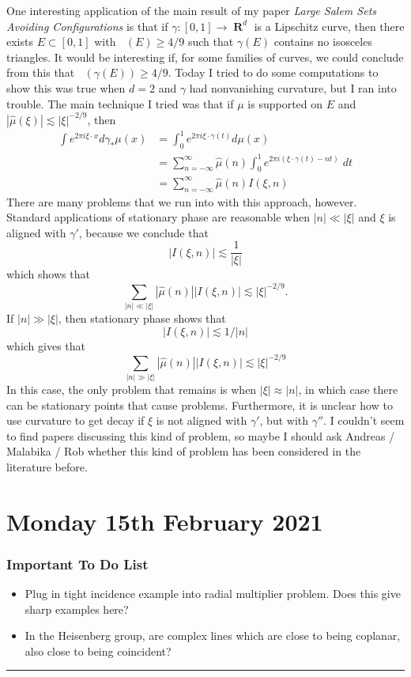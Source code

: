 \documentclass[openany,nobib,nols,a4paper,twoside,symmetric,justified,notoc]{tufte-book}
\theoremstyle{plain}
\theoremstyle{remark}
\theoremstyle{definition}
\newcommand{\currentchapter}{}
\let\oldchapter\chapter
\renewcommand{\chapter}[1]{\oldchapter{#1}\renewcommand{\currentchapter}{#1}}
\newenvironment{importanttodo}%
    {\subsection{Important To Do List}}%
    {\vspace{2mm}\hrule\hspace{\stretch{1}}\\}
\DeclareMathOperator{\RR}{\mathbf{R}}
\DeclareMathOperator{\fordim}{\text{dim}_{\mathbf{F}}}
\begin{document}
One interesting application of the main result of my paper \emph{Large Salem Sets Avoiding Configurations} is that if $\gamma: [0,1] \to \RR^d$ is a Lipschitz curve, then there exists $E \subset [0,1]$ with $\fordim(E) \geq 4/9$ such that $\gamma(E)$ contains no isosceles triangles. It would be interesting if, for some families of curves, we could conclude from this that $\fordim(\gamma(E)) \geq 4/9$. Today I tried to do some computations to show this was true when $d = 2$ and $\gamma$ had nonvanishing curvature, but I ran into trouble. The main technique I tried was that if $\mu$ is supported on $E$ and $|\widehat{\mu}(\xi)| \lesssim |\xi|^{-2/9}$, then
%
\begin{align*}
    \int e^{2 \pi i \xi \cdot x} d\gamma_* \mu(x) &= \int_0^1 e^{2 \pi i \xi \cdot \gamma(t)} d\mu(x)\\
    &= \sum_{n = -\infty}^\infty \widehat{\mu}(n) \int_0^1 e^{2 \pi i(\xi \cdot \gamma(t) - nt)}\; dt\\
    &= \sum_{n = -\infty}^\infty \widehat{\mu}(n) I(\xi,n)
\end{align*}
%
There are many problems that we run into with this approach, however. Standard applications of stationary phase are reasonable when $|n| \ll |\xi|$ and $\xi$ is aligned with $\gamma'$, because we conclude that
%
\[ |I(\xi,n)| \lesssim \frac{1}{|\xi|} \]
%
which shows that
%
\[ \sum_{|n| \ll |\xi|} |\widehat{\mu}(n)| |I(\xi,n)| \lesssim |\xi|^{- 2/9}. \]
%
If $|n| \gg |\xi|$, then stationary phase shows that
%
\[ |I(\xi,n)| \lesssim 1/|n| \]
%
which gives that
%
\[ \sum_{|n| \gg |\xi|} |\widehat{\mu}(n)| |I(\xi,n)| \lesssim |\xi|^{-2/9} \]
%
In this case, the only problem that remains is when $|\xi| \approx |n|$, in which case there can be stationary points that cause problems. Furthermore, it is unclear how to use curvature to get decay if $\xi$ is not aligned with $\gamma'$, but with $\gamma''$. I couldn't seem to find papers discussing this kind of problem, so maybe I should ask Andreas / Malabika / Rob whether this kind of problem has been considered in the literature before.









\chapter{Monday 15th February 2021} \label{15022021}

\begin{importanttodo}
    \begin{itemize}
        \item Plug in tight incidence example into radial multiplier problem. Does this give sharp examples here?

        \item In the Heisenberg group, are complex lines which are close to being coplanar, also close to being coincident?
    \end{itemize}
\end{importanttodo}
\end{document}
